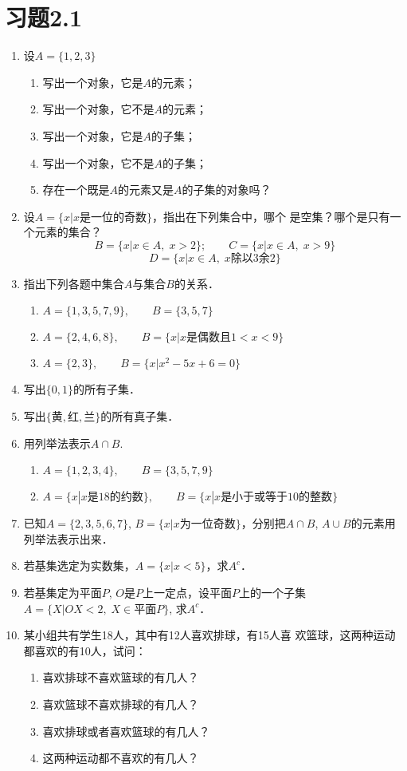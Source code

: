 \section*{习题2.1}
\begin{enumerate}
	\item 设$A=\{1, 2, 3\}$
	\begin{enumerate}
		\item 写出一个对象，它是$A$的元素；
		\item 写出一个对象，它不是$A$的元素；
		\item 写出一个对象，它是$A$的子集；
		\item 写出一个对象，它不是$A$的子集；
		\item 存在一个既是$A$的元素又是$A$的子集的对象吗？
	\end{enumerate}
	
	\item 设$A=\{x|x\text{是一位的奇数}\}$，指出在下列集合中，哪个
	是空集？哪个是只有一个元素的集合？
	\[B=\{x|x\in A,\; x>2\};\qquad C=\{x|x\in A,\;x>9\}\]
	\[D=\{x|x\in A,\;x\text{除以3余2}\}\]
	\item 指出下列各题中集合$A$与集合$B$的关系．
	\begin{enumerate}
		\item $A= \{1, 3, 5,7,9\},\qquad B=\{3,5,7\}$
		\item $A= \{2, 4, 6, 8\} ,\qquad B=\{x|x\text{是偶数且}1<x<9\}$
		\item $A= \{2, 3\} ,\qquad  B=\{x|x^2-5x+6=0\}$
	\end{enumerate}
	
	\item 写出$\{0, 1\}$的所有子集．
	\item 写出$\{\text{黄},\text{红},\text{兰}\}$的所有真子集．
	\item 用列举法表示$A\cap B$.
	\begin{enumerate}
		\item $A= \{1, 2, 3, 4\} ,\qquad B= \{3, 5, 7, 9\}$
		\item $A=\{x|x\text{是18的约数}\},\qquad B=\{x|x\text{是小于或等于10的整数}\}$
	\end{enumerate}
	
	\item 已知$A=\{2, 3, 5, 6, 7\}$, $B=\{x|x\text{为一位奇数}\}$，分别把$A\cap B$, $A\cup B$的元素用列举法表示出来．
	\item 若基集选定为实数集，$A=\{x|x<5\}$，求$A^c$．
	\item 若基集定为平面$P$, $O$是$P$上一定点，设平面$P$上的一个子集$A=\{X|OX<2,\; X\in \text{平面}P\}$, 求$A^c$．
	\item 某小组共有学生18人，其中有12人喜欢排球，有15人喜
	欢篮球，这两种运动都喜欢的有10人，试问：
	\begin{enumerate}
		\item 喜欢排球不喜欢篮球的有几人？   
		\item 喜欢篮球不喜欢排球的有几人？  
		\item 喜欢排球或者喜欢篮球的有几人？   
		\item 这两种运动都不喜欢的有几人？
	\end{enumerate}
\end{enumerate}

